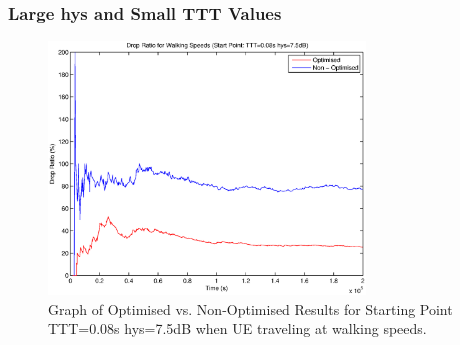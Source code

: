 \subsubsection*{Large hys and Small TTT Values}
\begin{figure}[H]
  \begin{center}
    	  \includegraphics[width=0.75\textwidth]{figures/walking_figures/highhys/long_drop.eps}
    \end{center}
    \caption{Graph of Optimised vs. Non-Optimised Results for Starting Point TTT=0.08s hys=7.5dB when UE traveling at walking speeds.}
    \label{fig:walk_highhys_drop}
\end{figure}

